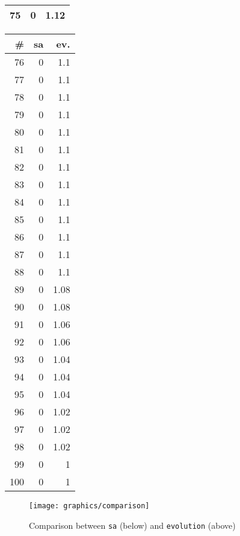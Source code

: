 \begin{appendices}
\begin{table}[h]
\begin{minipage}[t]{0.24\linewidth}
\begin{tabular}{|r|r|r|}
75 & 0 & 1.12\\
\hline
\end{tabular}
\end{minipage}
\begin{minipage}[t]{0.24\linewidth}
\begin{tabular}{|r|r|r|}
\hline
\# & sa & ev.\\
\hline
\hline
76 & 0 & 1.1\\
77 & 0 & 1.1\\
78 & 0 & 1.1\\
79 & 0 & 1.1\\
80 & 0 & 1.1\\
81 & 0 & 1.1\\
82 & 0 & 1.1\\
83 & 0 & 1.1\\
84 & 0 & 1.1\\
85 & 0 & 1.1\\
86 & 0 & 1.1\\
87 & 0 & 1.1\\
88 & 0 & 1.1\\
89 & 0 & 1.08\\
90 & 0 & 1.08\\
91 & 0 & 1.06\\
92 & 0 & 1.06\\
93 & 0 & 1.04\\
94 & 0 & 1.04\\
95 & 0 & 1.04\\
96 & 0 & 1.02\\
97 & 0 & 1.02\\
98 & 0 & 1.02\\
99 & 0 & 1\\
100 & 0 & 1\\
\hline
\end{tabular}
\end{minipage}
\label{tab:queenstat}
\end{table}

\begin{figure}[H]
\texttt{[image: graphics/comparison]}
\caption{Comparison between \texttt{sa} (below) and \texttt{evolution} (above)}
\label{fig:queenstat}
\end{figure}


\end{appendices}
